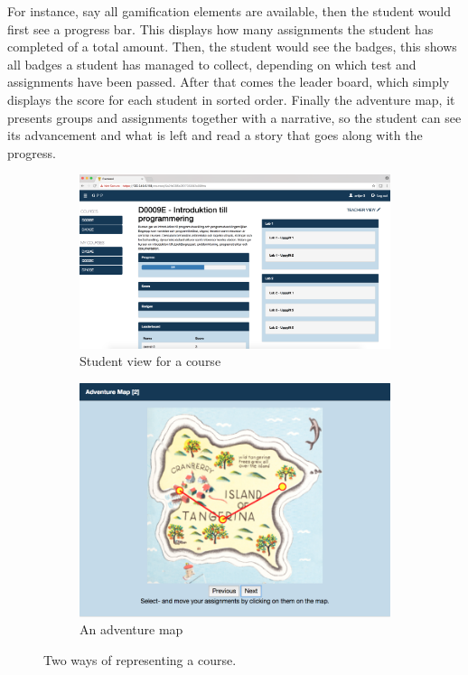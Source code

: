 For instance, say all gamification elements are available, then the student would first see a progress bar. This displays how many assignments the student has completed of a total amount. Then, the student would see the badges, this shows all badges a student has managed to collect, depending on which test and assignments have been passed. After that comes the leader board, which simply displays the score for each student in sorted order. Finally the adventure map, it presents groups and assignments together with a narrative, so the student can see its advancement and what is left and read a story that goes along with the progress.
\begin{figure}[H]
    \begin{subfigure}{.48\linewidth}
        \centering
        \includegraphics[width=\textwidth]{img/gppinpictures/studentview.png}
        \caption{Student view for a course}
        \label{fig:student}
    \end{subfigure}
    \hfill
    \begin{subfigure}{.48\linewidth}
        \centering
        \includegraphics[width=\textwidth]{img/gppinpictures/adventuremap.png}
        \caption{An adventure map}
        \label{fig:student}
    \end{subfigure}
    \caption{Two ways of representing a course.}
\end{figure}

